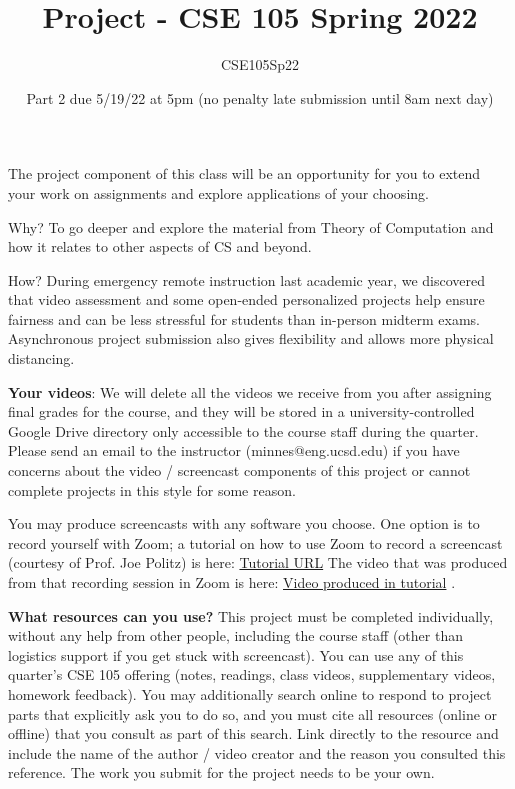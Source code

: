 \documentclass[12pt, oneside]{article}
\author{CSE105Sp22}
\title{Project - CSE 105 Spring 2022}
\date{Part 2 due 5/19/22 at 5pm (no penalty late submission until 8am next day)}
\begin{document}
\maketitle
\thispagestyle{fancy}

\vspace{-30pt}

 The project component of this class will be an opportunity for you to extend your work on 
 assignments and explore applications of your choosing. 
 
 Why?  To go deeper and explore the material from Theory of Computation and how it relates to 
 other aspects of CS and beyond. 
 
 How?  During emergency remote instruction last academic year, we discovered that video 
 assessment and some open-ended personalized projects help ensure fairness and can be less 
 stressful for students than in-person midterm exams. Asynchronous project submission also 
 gives flexibility and allows more physical distancing. 
 
 {\bf Your videos}: We will delete all the videos we receive from you after assigning final grades for 
 the course, and they will be stored in a university-controlled Google Drive directory only 
 accessible to the course staff during the quarter. Please send an email to the instructor 
 (minnes@eng.ucsd.edu) if you have concerns about the video / screencast components of this 
 project or cannot complete projects in this style for some reason. 
 
 You may produce screencasts with any software you choose. One option is to record yourself 
 with Zoom; a tutorial on how to use Zoom to record a screencast (courtesy of Prof. Joe Politz) is 
 here: \href{https://drive.google.com/open?id=1KROMAQuTCk40zwrEFotlYSJJQdcG_GUU}{Tutorial URL}
 The video that was produced from that recording session in Zoom is here:
 \href{{https://drive.google.com/open?id=1MxJN6CQcXqIbOekDYMxjh7mTt1TyRVMl}}{Video produced in tutorial} .
 
 {\bf What resources can you use? }
 This project must be completed individually, without any help from other people, 
 including the course staff (other than logistics support if you get stuck with screencast). 
 You can use any of this quarter’s CSE 105 offering (notes, readings, class videos, 
 supplementary videos, homework feedback). You may additionally search online to respond to 
 project parts that explicitly ask you to do so, and you must  cite all resources (online or offline) 
 that you consult as part of this search. Link directly to the resource and include the name of the 
 author / video creator and the reason you consulted this reference. The work you submit for the 
 project needs to be your own. 
 
\end{document}
